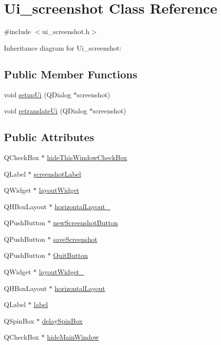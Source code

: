 \hypertarget{classUi__screenshot}{
\section{Ui\_\-screenshot Class Reference}
\label{classUi__screenshot}
}


{\ttfamily \#include $<$ui\_\-screenshot.h$>$}



Inheritance diagram for Ui\_\-screenshot:
\subsection*{Public Member Functions}
\begin{DoxyCompactItemize}
\item 
void \hyperlink{classUi__screenshot_a2953c741ab7b0b4aa2901f3fa3326bc3}{setupUi} (QDialog $\ast$screenshot)
\item 
void \hyperlink{classUi__screenshot_afefaa506ec424c6c481a953afea4187e}{retranslateUi} (QDialog $\ast$screenshot)
\end{DoxyCompactItemize}
\subsection*{Public Attributes}
\begin{DoxyCompactItemize}
\item 
QCheckBox $\ast$ \hyperlink{classUi__screenshot_a302c64bae3d7e039369b7ff51a6cfd96}{hideThisWindowCheckBox}
\item 
QLabel $\ast$ \hyperlink{classUi__screenshot_aa935229caf3a6831fd0b9e9372882f9e}{screenshotLabel}
\item 
QWidget $\ast$ \hyperlink{classUi__screenshot_ab547916593a2a044de05f06d60f00adb}{layoutWidget}
\item 
QHBoxLayout $\ast$ \hyperlink{classUi__screenshot_a9674ef9297d04ecba53e20df684cd955}{horizontalLayout\_}
\item 
QPushButton $\ast$ \hyperlink{classUi__screenshot_a1968e684c0abd18197e33de63bbf597d}{newScreenshotButton}
\item 
QPushButton $\ast$ \hyperlink{classUi__screenshot_afb9c97a8b8838d3459b2fe7741bce4a3}{saveScreenshot}
\item 
QPushButton $\ast$ \hyperlink{classUi__screenshot_a0147ccabb2901f567d2524bd495315da}{QuitButton}
\item 
QWidget $\ast$ \hyperlink{classUi__screenshot_a814d1f5ebdeeb7cb2c083253609f71c2}{layoutWidget\_}
\item 
QHBoxLayout $\ast$ \hyperlink{classUi__screenshot_a6e891cbda23b216532845c5ca2b3edb3}{horizontalLayout}
\item 
QLabel $\ast$ \hyperlink{classUi__screenshot_a748678988896dca422c17f13394f3d90}{label}
\item 
QSpinBox $\ast$ \hyperlink{classUi__screenshot_a37924d707077bd389b53ac026e132883}{delaySpinBox}
\item 
QCheckBox $\ast$ \hyperlink{classUi__screenshot_acbaa4ec23e0b6f51e1aac36432b3d142}{hideMainWindow}
\end{DoxyCompactItemize}


